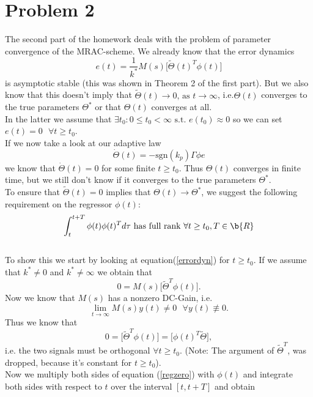 \documentclass[12pt,a4paper]{article}
\begin{document}
	\section*{Problem 2}
	The second part of the homework deals with the problem of parameter convergence of the MRAC-scheme. We already know that the error dynamics
	\begin{equation}
	\label{errordyn}
	e(t) = \frac{1}{k^*}M(s)\Big[ \tilde{\Theta}(t)^T \phi(t)\Big]
	\end{equation}
	is asymptotic stable (this was shown in Theorem 2 of the first part). But we also know that this doesn't imply that $\tilde{\Theta}(t) \to 0\text{, as } t \to \infty$, i.e.$\Theta(t)$ converges to the true parameters $\Theta^*$ or that $\Theta(t)$ converges at all.\\
	In the latter we assume that $\exists t_0:  0 \leq t_0 < \infty \text{ s.t. } e(t_0) \approx 0$ so we can set $e(t) = 0\text{ } \forall t \geq t_0$.\\
	If we now take a look at our adaptive law
	\[ \dot{\Theta}(t) = -\text{sgn}(k_p) \Gamma \phi e\]
	we know that $\dot{\Theta}(t) = 0$ for some finite $t \geq t_0$. Thus $\Theta(t)$ converges in finite time, but we still don't know if it converges to the true parameters $\Theta^*$.\\
	To ensure that $\tilde{\Theta}(t) = 0$ implies that $\Theta(t) \to \Theta^*$, we suggest the following requirement on the regressor $\phi(t)$:
	\begin{equation}
	\label{claim2}
	\int_t^{t+T} \phi(t) \phi(t)^T d\tau \text{ has full rank } \forall t \geq t_0 ,T \in \b{R} 
	\end{equation}
	\\
	To show this we start by looking at equation(\ref{errordyn}) for $t \geq t_0$. If we assume that $k^* \neq 0$ and $k^* \neq \infty$ we obtain that
	\[ 0 = M(s) \Big[ \tilde{\Theta}^T \phi(t)\Big]. \]
	Now we know that $M(s)$ has a nonzero DC-Gain, i.e.
	\[ \lim_{t \to \infty} M(s)y(t) \neq 0\text{ } \forall y(t) \not\equiv 0.\]
	Thus we know that
	\begin{equation}
	\label{regzero}
	0 =  \Big[ \tilde{\Theta}^T \phi(t)\Big] =  \Big[ \phi(t)^T \tilde{\Theta}\Big],
	\end{equation}
	i.e. the two signals must be orthogonal $\forall t \geq t_0$. (Note: The argument of $\tilde{\Theta}^T$, was dropped, because it's constant for $t \geq t_0$).\\
	Now we multiply both sides of equation (\ref{regzero}) with $\phi(t)$ and integrate both sides with respect to $t$ over the interval $[t,t+T]$ and obtain
\end{document}
